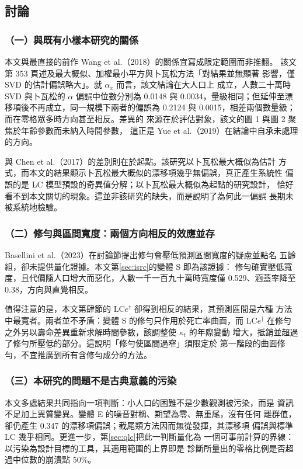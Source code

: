 \documentclass[UTF8, fontset=macnew, a4paper, 12pt]{ctexart}
\newcommand{\cn}[1]{\ding{\number\numexpr171+#1\relax}}
\newcommand{\LCe}{\mathrm{LC}e^{\dagger}}
\begin{document}
\subsection{討論}

\subsubsection{（一）與既有小樣本研究的關係}

本文與最直接的前作 Wang et al.（2018）的關係宜寫成限定範圍而非推翻。
該文第 353 頁述及最大概似、加權最小平方與卜瓦松方法「對結果並無顯著
影響，僅 SVD 的估計偏誤略大」。就 $\alpha_x$ 而言，該文結論在大人口上
成立，人數二十萬時 SVD 與卜瓦松的 $\alpha$ 偏誤中位數分別為 0.0148 與
0.0034，量級相同；但延伸至漂移項後不再成立，同一規模下兩者的偏誤為
0.2124 與 0.0015，相差兩個數量級；而在零格眾多時方向甚至相反。差異的
來源在於評估對象，該文的圖 1 與圖 2 聚焦於年齡參數而未納入時間參數，
這正是 Yue et al.（2019）在結論中自承未處理的方向。

與 Chen et al.（2017）的差別則在於起點。該研究以卜瓦松最大概似為估計
方式，而本文的結果顯示卜瓦松最大概似的漂移項幾乎無偏誤，真正產生系統性
偏誤的是 LC 模型預設的奇異值分解；以卜瓦松最大概似為起點的研究設計，
恰好看不到本文關切的現象。這並非該研究的缺失，而是說明了為何此一偏誤
長期未被系統地檢驗。

\subsubsection{（二）修勻與區間寬度：兩個方向相反的效應並存}

Basellini et al.（2023）在討論節提出修勻會壓低預測區間寬度的疑慮並點名
五齡組，卻未提供量化證據。本文第\ref{sec:isrc}的變體 S 即為該證據：
修勻確實壓低寬度，且代價隨人口增大而惡化，人數一千一百九十萬時寬度僅
0.529、涵蓋率降至 0.38，方向與直覺相反。

值得注意的是，本文第肆節的 $\LCe$ 卻得到相反的結果，其預測區間是六種
方法中最寬者。兩者並不矛盾：變體 S 的修勻只作用於死亡率曲面，而 $\LCe$
在修勻之外另以壽命差異重新求解時間參數，該調整使 $\kappa_t$ 的年際變動
增大，抵銷並超過了修勻所壓低的部分。這說明「修勻使區間過窄」須限定於
第一階段的曲面修勻，不宜推廣到所有含修勻成分的方法。

\subsubsection{（三）本研究的問題不是古典意義的污染}

本文多處結果共同指向一項判斷：小人口的困難不是少數觀測被污染，而是
資訊不足加上異質變異。變體 E 的噪音對稱、期望為零、無重尾，沒有任何
離群值，卻仍產生 0.347 的漂移項偏誤；截尾類方法因而無從發揮，其漂移項
偏誤與標準 LC 幾乎相同。更進一步，第\ref{sec:qlc}把此一判斷量化為
一個可事前計算的界線：以污染為設計目標的工具，其適用範圍的上界即是
診斷\cn{2}所量出的零格比例是否超過中位數的崩潰點 50\%。
\end{document}
